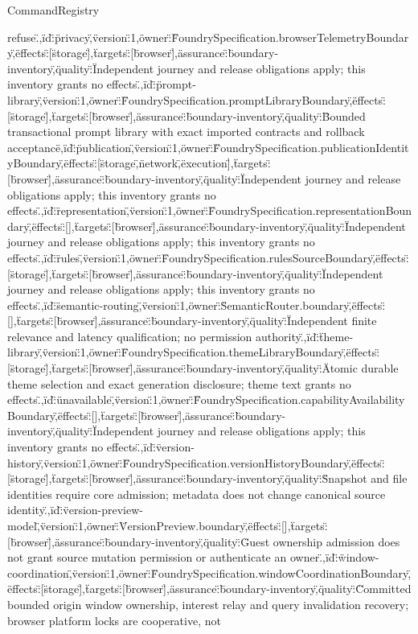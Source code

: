 \begin{lexlean}{CommandRegistry}
\begin{semanticmodule}
{refuse.\"},{\"id\":\"privacy\",\"version\":1,\"owner\":\"FoundrySpecification.browserTelemetryBoundary\",\"effects\":[\"storage\"],\"targets\":[\"browser\"],\"assurance\":\"boundary-inventory\",\"quality\":\"Independent journey and release obligations apply; this inventory grants no effects.\"},{\"id\":\"prompt-library\",\"version\":1,\"owner\":\"FoundrySpecification.promptLibraryBoundary\",\"effects\":[\"storage\"],\"targets\":[\"browser\"],\"assurance\":\"boundary-inventory\",\"quality\":\"Bounded transactional prompt library with exact imported contracts and rollback acceptance\"},{\"id\":\"publication\",\"version\":1,\"owner\":\"FoundrySpecification.publicationIdentityBoundary\",\"effects\":[\"storage\",\"network\",\"execution\"],\"targets\":[\"browser\"],\"assurance\":\"boundary-inventory\",\"quality\":\"Independent journey and release obligations apply; this inventory grants no effects.\"},{\"id\":\"representation\",\"version\":1,\"owner\":\"FoundrySpecification.representationBoundary\",\"effects\":[],\"targets\":[\"browser\"],\"assurance\":\"boundary-inventory\",\"quality\":\"Independent journey and release obligations apply; this inventory grants no effects.\"},{\"id\":\"rules\",\"version\":1,\"owner\":\"FoundrySpecification.rulesSourceBoundary\",\"effects\":[\"storage\"],\"targets\":[\"browser\"],\"assurance\":\"boundary-inventory\",\"quality\":\"Independent journey and release obligations apply; this inventory grants no effects.\"},{\"id\":\"semantic-routing\",\"version\":1,\"owner\":\"SemanticRouter.boundary\",\"effects\":[],\"targets\":[\"browser\"],\"assurance\":\"boundary-inventory\",\"quality\":\"Independent finite relevance and latency qualification; no permission authority.\"},{\"id\":\"theme-library\",\"version\":1,\"owner\":\"FoundrySpecification.themeLibraryBoundary\",\"effects\":[\"storage\"],\"targets\":[\"browser\"],\"assurance\":\"boundary-inventory\",\"quality\":\"Atomic durable theme selection and exact generation disclosure; theme text grants no effects.\"},{\"id\":\"unavailable\",\"version\":1,\"owner\":\"FoundrySpecification.capabilityAvailabilityBoundary\",\"effects\":[],\"targets\":[\"browser\"],\"assurance\":\"boundary-inventory\",\"quality\":\"Independent journey and release obligations apply; this inventory grants no effects.\"},{\"id\":\"version-history\",\"version\":1,\"owner\":\"FoundrySpecification.versionHistoryBoundary\",\"effects\":[\"storage\"],\"targets\":[\"browser\"],\"assurance\":\"boundary-inventory\",\"quality\":\"Snapshot and file identities require core admission; metadata does not change canonical source identity.\"},{\"id\":\"version-preview-model\",\"version\":1,\"owner\":\"VersionPreview.boundary\",\"effects\":[],\"targets\":[\"browser\"],\"assurance\":\"boundary-inventory\",\"quality\":\"Guest ownership admission does not grant source mutation permission or authenticate an owner.\"},{\"id\":\"window-coordination\",\"version\":1,\"owner\":\"FoundrySpecification.windowCoordinationBoundary\",\"effects\":[\"storage\"],\"targets\":[\"browser\"],\"assurance\":\"boundary-inventory\",\"quality\":\"Committed bounded origin window ownership, interest relay and query invalidation recovery; browser platform locks are cooperative, not }
\end{semanticmodule}
\end{lexlean}
